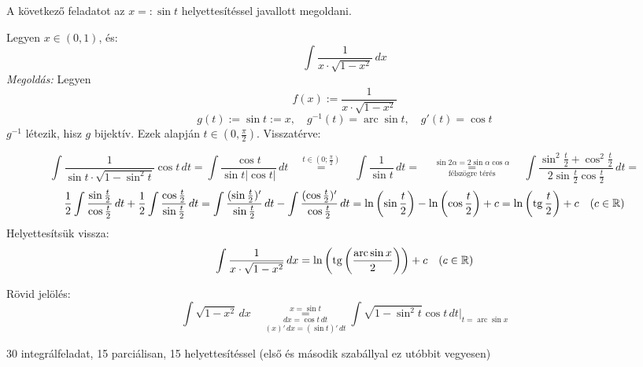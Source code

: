 \documentclass[a4paper,11.5pt]{article}
\DeclareMathOperator{\tg}{tg}
\DeclareMathOperator{\arc}{arc}
\begin{document}
	\begin{exercise}A következő feladatot az $x=:\sin t$ helyettesítéssel javallott megoldani. 
		
		Legyen $x\in(0,1)$, és:
		\[ \int\frac{1}{x\cdot\sqrt{1-x^2}}\,dx \]
		\textit{Megoldás:} Legyen
		\[ f(x):=\frac{1}{x\cdot\sqrt{1-x^2}} \]
		\[ g(t) := \sin t := x,\quad g^{-1}(t) = \arc\sin t,\quad g'(t) = \cos t \]
		$g^{-1}$ létezik, hisz $g$ bijektív. Ezek alapján $t\in\left(0,\frac{\pi}{2} \right)$. Visszatérve:
		
		\[ \int\frac{1}{\sin t\cdot\sqrt{1-\sin^2t}}\cos t\,dt=\int\frac{\cos t}{\sin t|\cos t|}\,dt\quad \overset{t\in\left(0;\frac{\pi}{2}\right)}{=}\quad\int\frac{1}{\sin t}\,dt=\quad \overset{\sin2\alpha=2\sin\alpha\cos\alpha}{\underset{\text{félszögre térés}}{=}}\quad \int\frac{\sin^2\frac{t}{2}+\cos^2\frac{t}{2}}{2\sin\frac{t}{2}\cos\frac{t}{2}}\,dt=\]
		\[\frac{1}{2}\int\frac{\sin\frac{t}{2}}{\cos\frac{t}{2}}\,dt+\frac{1}{2}\int\frac{\cos\frac{t}{2}}{\sin\frac{t}{2}}\,dt=\int\frac{(\sin\frac{t}{2})'}{\sin\frac{t}{2}}\,dt-\int\frac{(\cos\frac{t}{2})'}{\cos\frac{t}{2}}\,dt=\ln\left(\sin\frac{t}{2}\right)-\ln\left(\cos\frac{t}{2}\right)+c=\ln\left(\tg\frac{t}{2}\right)+c\quad (c\in\R) \]
		Helyettesítsük vissza:
		\[\int\frac{1}{x\cdot\sqrt{1-x^2}}\,dx=\ln\left(\tg\left(\frac{\arc\sin x}{2}\right)\right)+c\quad (c\in\R) \]
	\end{exercise}
	\begin{note}
		Rövid jelölés:
		\[ \int\sqrt{1-x^2}\,dx\quad \overset{x=\sin t}{\underset{(x)'\,dx=(\sin t)'\,dt}{\underset{dx=\cos t\,dt}{=}}}\int\sqrt{1-\sin^2 t}\cos t\,dt\big|_{t=\arc\sin x} \]
	\end{note}
	\begin{exercise}
		30 integrálfeladat, 15 parciálisan, 15 helyettesítéssel (első és második szabállyal ez utóbbit vegyesen)
	\end{exercise}
	\bigskip
	
\end{document}
